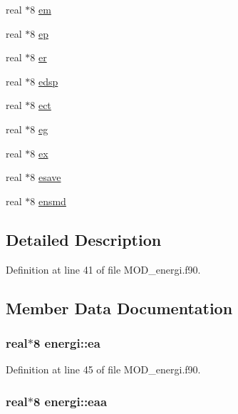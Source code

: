 \begin{DoxyCompactItemize}
\item 
real $\ast$8 \hyperlink{classenergi_ae647bdb19dc415c1a53266e17340ee6b}{em}
\item 
real $\ast$8 \hyperlink{classenergi_a141a83a1bafc312717634cbb6dbb8352}{ep}
\item 
real $\ast$8 \hyperlink{classenergi_a00095477515fd739e083babc19b047ec}{er}
\item 
real $\ast$8 \hyperlink{classenergi_af8d9779b268ab2146182f415ea3b3e43}{edsp}
\item 
real $\ast$8 \hyperlink{classenergi_a8a7db8c40cadd4fb010504fdad89ec38}{ect}
\item 
real $\ast$8 \hyperlink{classenergi_ac3a05d45c734d9ea73049e25f5d0e3ec}{eg}
\item 
real $\ast$8 \hyperlink{classenergi_abdfff07b534d7022aeecfc65e0a82894}{ex}
\item 
real $\ast$8 \hyperlink{classenergi_a01162e5eecaf58dcbc7b5ffb269aa1e4}{esave}
\item 
real $\ast$8 \hyperlink{classenergi_ae7c5bfdf9b27be0c3dcf0b02233d39d4}{ensmd}
\end{DoxyCompactItemize}


\subsection{Detailed Description}


Definition at line 41 of file M\-O\-D\-\_\-energi.\-f90.



\subsection{Member Data Documentation}
\hypertarget{classenergi_add88b8513281bf7e45c046e37b0e2a0a}{
\subsubsection[{ea}]{\setlength{\rightskip}{0pt plus 5cm}real$\ast$8 energi\-::ea}}\label{classenergi_add88b8513281bf7e45c046e37b0e2a0a}


Definition at line 45 of file M\-O\-D\-\_\-energi.\-f90.

\hypertarget{classenergi_ac2cd1c7e7a5183a9e74e04b7fd7afd6b}{
\subsubsection[{eaa}]{\setlength{\rightskip}{0pt plus 5cm}real$\ast$8 energi\-::eaa}}\label{classenergi_ac2cd1c7e7a5183a9e74e04b7fd7afd6b}


